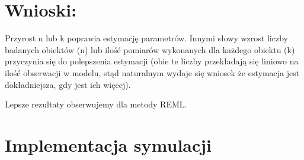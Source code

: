 \documentclass[a4paper,11pt]{article}
\begin{document}
\section{Wnioski:}

Przyrost n lub k poprawia estymację parametrów. Innymi słowy wzrost liczby badanych obiektów (n) lub ilość pomiarów wykonanych dla każdego obiektu (k) przyczynia się do polepszenia estymacji (obie te liczby przekładają się liniowo na ilość obserwacji w modelu, stąd naturalnym wydaje się wniosek że  estymacja jest dokładniejsza, gdy jest ich więcej).

 Lepsze rezultaty obserwujemy dla metody REML.

\section{Implementacja symulacji}
\end{document}
